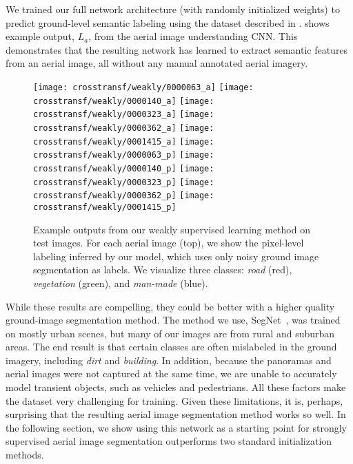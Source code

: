 We trained our full network architecture (with randomly initialized
weights) to predict ground-level semantic labeling using the dataset
described in .   shows example output,
$L_a$, from the aerial image understanding CNN. This demonstrates that
the resulting network has learned to extract semantic features from an
aerial image, all without any manual annotated aerial imagery.

\begin{figure}
	\centering
	\texttt{[image: crosstransf/weakly/0000063\_a]} \hfill
	\texttt{[image: crosstransf/weakly/0000140\_a]} \hfill
	\texttt{[image: crosstransf/weakly/0000323\_a]} \hfill
	\texttt{[image: crosstransf/weakly/0000362\_a]} \hfill
	\texttt{[image: crosstransf/weakly/0001415\_a]}
  \newline
	\texttt{[image: crosstransf/weakly/0000063\_p]} \hfill
	\texttt{[image: crosstransf/weakly/0000140\_p]} \hfill
	\texttt{[image: crosstransf/weakly/0000323\_p]} \hfill
	\texttt{[image: crosstransf/weakly/0000362\_p]} \hfill
	\texttt{[image: crosstransf/weakly/0001415\_p]}
  \caption{Example outputs from our weakly supervised learning method
    on test images.  For each aerial image (top), we show the
    pixel-level labeling inferred by our model, which uses only noisy
    ground image segmentation as labels.  We visualize three classes:
    {\em road} (red), {\em vegetation} (green), and {\em man-made} 
    (blue).}
  \label{fig:weakly}
\end{figure}

While these results are compelling, they could be better with a higher
quality ground-image segmentation method.  The method we use,
SegNet~\cite{badrinarayanan2015segnet}, was trained on mostly urban
scenes, but many of our images are from rural and suburban areas.  The
end result is that certain classes are often mislabeled in the ground
imagery, including {\em dirt} and {\em building}.  In addition,
because the panoramas and aerial images were not captured at the same
time, we are unable to accurately model transient objects, such as
vehicles and pedestrians. All these factors make the dataset very
challenging for training. Given these limitations, it is, perhaps,
surprising that the resulting aerial image segmentation method works
so well.  In the following section, we show using this network as a
starting point for strongly supervised aerial image segmentation
outperforms two standard initialization methods. 


